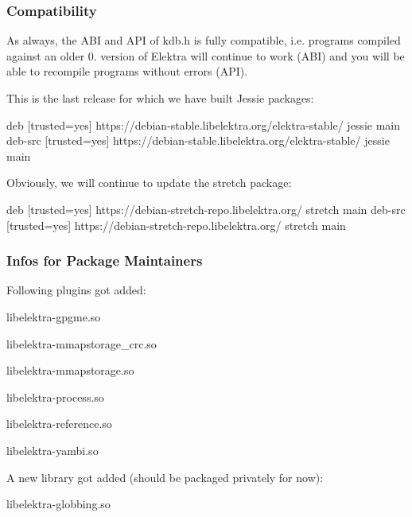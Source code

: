\subsubsection*{Compatibility}

As always, the A\+BI and A\+PI of kdb.\+h is fully compatible, i.\+e. programs compiled against an older 0. version of Elektra will continue to work (A\+BI) and you will be able to recompile programs without errors (A\+PI).

This is the last release for which we have built Jessie packages\+:


\begin{DoxyCode}
deb     [trusted=yes] https://debian-stable.libelektra.org/elektra-stable/ jessie main
deb-src [trusted=yes] https://debian-stable.libelektra.org/elektra-stable/ jessie main
\end{DoxyCode}


Obviously, we will continue to update the stretch package\+:


\begin{DoxyCode}
deb     [trusted=yes] https://debian-stretch-repo.libelektra.org/ stretch main
deb-src [trusted=yes] https://debian-stretch-repo.libelektra.org/ stretch main
\end{DoxyCode}


\subsubsection*{Infos for Package Maintainers}

Following plugins got added\+:


\begin{DoxyItemize}
\item libelektra-\/gpgme.\+so
\item libelektra-\/mmapstorage\+\_\+crc.\+so
\item libelektra-\/mmapstorage.\+so
\item libelektra-\/process.\+so
\item libelektra-\/reference.\+so
\item libelektra-\/yambi.\+so
\end{DoxyItemize}

A new library got added (should be packaged privately for now)\+:


\begin{DoxyItemize}
\item libelektra-\/globbing.\+so
\end{DoxyItemize}

